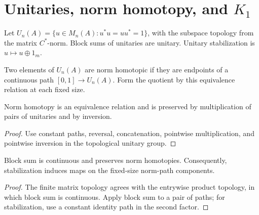 \section{Unitaries, norm homotopy, and $K_1$}

\begin{definition}\label{def:matrix-unitary}
\leanok
Let $U_n(A)=\{u\in M_n(A):u^*u=uu^*=1\}$, with the subspace topology
from the matrix $C^*$-norm. Block sums of unitaries are unitary.
Unitary stabilization is $u\mapsto u\oplus 1_m$.
\end{definition}

\begin{definition}\label{def:unitary-norm-homotopy}
\leanok
Two elements of $U_n(A)$ are norm homotopic if they are endpoints of a
continuous path $[0,1]\to U_n(A)$. Form the quotient by this equivalence
relation at each fixed size.
\end{definition}

\begin{proposition}\label{prop:unitary-homotopy-operations}
Norm homotopy is an equivalence relation and is preserved by multiplication
of pairs of unitaries and by inversion.
\end{proposition}
\begin{proof}
\leanok
Use constant paths, reversal, concatenation, pointwise multiplication,
and pointwise inversion in the topological unitary group.
\end{proof}

\begin{proposition}\label{prop:unitary-homotopy-stabilization}
Block sum is continuous and preserves norm homotopies. Consequently,
stabilization induces maps on the fixed-size norm-path components.
\end{proposition}
\begin{proof}
\leanok
The finite matrix topology agrees with the entrywise product topology,
in which block sum is continuous. Apply block sum to a pair of paths;
for stabilization, use a constant identity path in the second factor.
\end{proof}

